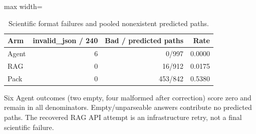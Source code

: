\begin{table}[t]
\centering
\caption{Scientific format failures and pooled nonexistent predicted paths.}\label{tab:failures}
\small
\begin{adjustbox}{max width=\columnwidth}\begin{tabular}{lrrr}
\toprule
Arm & invalid\_json / 240 & Bad / predicted paths & Rate \\
\midrule
Agent & 6 & 0/997 & 0.0000 \\
RAG & 0 & 16/912 & 0.0175 \\
Pack & 0 & 453/842 & 0.5380 \\
\bottomrule
\end{tabular}\end{adjustbox}
\par\vspace{2pt}\begin{minipage}{\columnwidth}\footnotesize Six Agent outcomes (two empty, four malformed after correction) score zero and remain in all denominators. Empty/unparseable answers contribute no predicted paths. The recovered RAG API attempt is an infrastructure retry, not a final scientific failure.\end{minipage}
\end{table}
